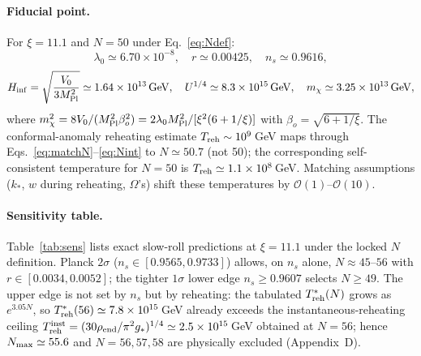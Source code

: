 \documentclass[pdflatex,sn-mathphys-num]{sn-jnl}
\newcommand{\MP}{M_{\rm Pl}}
\theoremstyle{thmstyleone}
\begin{document}
\paragraph{Fiducial point.} For $\xi=11.1$ and $N=50$ under Eq.~\eqref{eq:Ndef}:
\begin{equation}
\lambda_0\simeq6.70\times10^{-8},\quad
r\simeq0.00425,\quad
n_s\simeq0.9616,
\end{equation}
\begin{equation}
H_{\rm inf}=\sqrt{\frac{V_0}{3\MP^2}}\simeq1.64\times10^{13}\,{\rm GeV},\quad
U^{1/4}\simeq8.3\times10^{15}\,{\rm GeV},\quad
m_\chi\simeq3.25\times10^{13}\,{\rm GeV},
\label{eq:scales_locked}
\end{equation}
where $m_\chi^2=8V_0/(\MP^2\beta_o^2)=2\lambda_0\MP^2/[\xi^2(6+1/\xi)]$ with $\beta_o=\sqrt{6+1/\xi}$. The conformal-anomaly reheating estimate $T_{\rm reh}\sim10^9\,$GeV maps through Eqs.~\eqref{eq:matchN}--\eqref{eq:Nint} to $N\simeq50.7$ (not 50); the corresponding self-consistent temperature for $N=50$ is $T_{\rm reh}\simeq1.1\times10^{8}\,$GeV. Matching assumptions ($k_*$, $w$ during reheating, $\Omega$'s) shift these temperatures by $\mathcal{O}(1)$--$\mathcal{O}(10)$.

\paragraph{Sensitivity table.} Table~\ref{tab:sens} lists exact slow-roll predictions at $\xi=11.1$ under the locked $N$ definition. Planck $2\sigma$ ($n_s\in[0.9565,0.9733]$) allows, on $n_s$ alone, $N\approx45$--$56$ with $r\in[0.0034,0.0052]$; the tighter $1\sigma$ lower edge $n_s\geq0.9607$ selects $N\geq49$. The upper edge is not set by $n_s$ but by reheating: the tabulated $T_{\rm reh}^*(N)$ grows as $e^{3.05N}$, so $T_{\rm reh}^*(56)\simeq7.8\times10^{15}\,$GeV already exceeds the instantaneous-reheating ceiling $T_{\rm reh}^{\rm inst}=(30\rho_{\rm end}/\pi^2g_*)^{1/4}\simeq2.5\times10^{15}\,$GeV obtained at $N=56$; hence $N_{\rm max}\simeq55.6$ and $N=56,57,58$ are physically excluded (Appendix~D).
\end{document}
